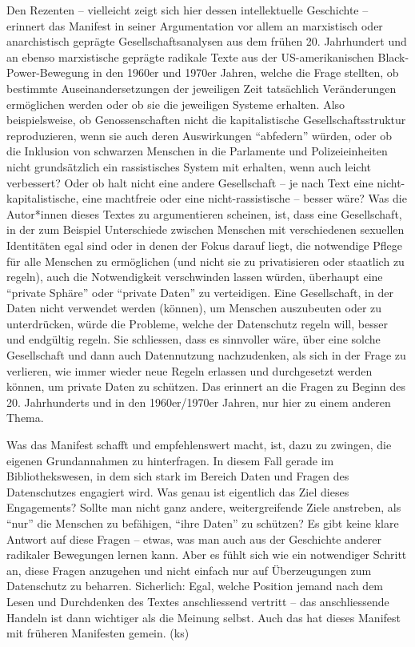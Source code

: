 \documentclass[a4paper,
fontsize=11pt,
oneside,
numbers=noperiodatend,
parskip=half-,
bibliography=totoc,
final
]{scrartcl}
\begin{document}
Den Rezenten -- vielleicht zeigt sich hier dessen intellektuelle
Geschichte -- erinnert das Manifest in seiner Argumentation vor allem an
marxistisch oder anarchistisch geprägte Gesellschaftsanalysen aus dem
frühen 20. Jahrhundert und an ebenso marxistische geprägte radikale
Texte aus der US-amerikanischen Black-Power-Bewegung in den 1960er und
1970er Jahren, welche die Frage stellten, ob bestimmte
Auseinandersetzungen der jeweiligen Zeit tatsächlich Veränderungen
ermöglichen werden oder ob sie die jeweiligen Systeme erhalten. Also
beispielsweise, ob Genossenschaften nicht die kapitalistische
Gesellschaftsstruktur reproduzieren, wenn sie auch deren Auswirkungen
\enquote{abfedern} würden, oder ob die Inklusion von schwarzen Menschen
in die Parlamente und Polizeieinheiten nicht grundsätzlich ein
rassistisches System mit erhalten, wenn auch leicht verbessert? Oder ob
halt nicht eine andere Gesellschaft -- je nach Text eine
nicht-kapitalistische, eine machtfreie oder eine nicht-rassistische --
besser wäre? Was die Autor*innen dieses Textes zu argumentieren
scheinen, ist, dass eine Gesellschaft, in der zum Beispiel Unterschiede
zwischen Menschen mit verschiedenen sexuellen Identitäten egal sind oder
in denen der Fokus darauf liegt, die notwendige Pflege für alle Menschen
zu ermöglichen (und nicht sie zu privatisieren oder staatlich zu
regeln), auch die Notwendigkeit verschwinden lassen würden, überhaupt
eine \enquote{private Sphäre} oder \enquote{private Daten} zu
verteidigen. Eine Gesellschaft, in der Daten nicht verwendet werden
(können), um Menschen auszubeuten oder zu unterdrücken, würde die
Probleme, welche der Datenschutz regeln will, besser und endgültig
regeln. Sie schliessen, dass es sinnvoller wäre, über eine solche
Gesellschaft und dann auch Datennutzung nachzudenken, als sich in der
Frage zu verlieren, wie immer wieder neue Regeln erlassen und
durchgesetzt werden können, um private Daten zu schützen. Das erinnert
an die Fragen zu Beginn des 20. Jahrhunderts und in den 1960er/1970er
Jahren, nur hier zu einem anderen Thema.

Was das Manifest schafft und empfehlenswert macht, ist, dazu zu zwingen,
die eigenen Grundannahmen zu hinterfragen. In diesem Fall gerade im
Bibliothekswesen, in dem sich stark im Bereich Daten und Fragen des
Datenschutzes engagiert wird. Was genau ist eigentlich das Ziel dieses
Engagements? Sollte man nicht ganz andere, weitergreifende Ziele
anstreben, als \enquote{nur} die Menschen zu befähigen, \enquote{ihre
Daten} zu schützen? Es gibt keine klare Antwort auf diese Fragen --
etwas, was man auch aus der Geschichte anderer radikaler Bewegungen
lernen kann. Aber es fühlt sich wie ein notwendiger Schritt an, diese
Fragen anzugehen und nicht einfach nur auf Überzeugungen zum Datenschutz
zu beharren. Sicherlich: Egal, welche Position jemand nach dem Lesen und
Durchdenken des Textes anschliessend vertritt -- das anschliessende
Handeln ist dann wichtiger als die Meinung selbst. Auch das hat dieses
Manifest mit früheren Manifesten gemein. (ks)
\end{document}
